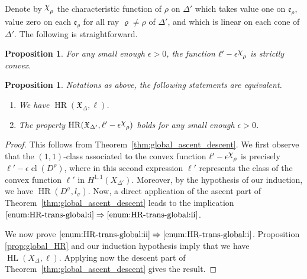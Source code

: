 \documentclass[11pt]{amsart}
\newcommand{\defaultRoman}{{\textnormal{(\textit{\roman*})}}}
\newtheorem{prop}[thm]{Proposition}
\theoremstyle{definition}
\numberwithin{equation}{section}
\renewcommand{\~}{\widetilde}
\let\oldchi\chi
\newcommand{\raisechi}[2]{\raisebox{.4ex}{$#1#2$}}
\renewcommand{\chi}{{\mathpalette\raisechi\oldchi}}
\DeclareMathOperator{\HR}{HR} %
\DeclareMathOperator{\HL}{HL} %
\DeclareMathOperator{\class}{cl} %
\newcommand{\e}{{\mathfrak e}} %
\newcommand{\X}{\mathfrak X}
\begin{document}
Denote by $\chi_\rho$ the characteristic function of $\rho$ on $\Delta'$ which takes value one on $\e_\rho$, value zero on each $\e_\varrho$ for all ray $\varrho \neq \rho$ of $\Delta'$, and which is linear on each cone of $\Delta'$.
The following is straightforward.

\begin{prop} For any small enough $\epsilon>0$, the function $\ell' - \epsilon \chi_\rho$ is strictly convex. \end{prop}

\begin{prop} \label{prop:HR-trans-global}
Notations as above, the following statements are equivalent.
\begin{enumerate}[label=\defaultRoman]
\item \label{enum:HR-trans-global:i} We have $\HR(\X_\Delta, \ell)$.
\item \label{enum:HR-trans-global:ii} The property $\HR(\X_{\Delta'},\ell'-\epsilon \chi_\rho)$ holds for any small enough $\epsilon>0$.
\end{enumerate}
\end{prop}

\begin{proof}
This follows from Theorem~\ref{thm:global_ascent_descent}. We first observe that the $(1,1)$-class associated to the convex function $\ell'-\epsilon \chi_\rho$ is precisely $\ell' - \epsilon \class(D^\rho)$, where in this second expression $\ell'$ represents the class of the convex function $\ell'$ in $H^{1,1}(X_{\Delta'})$. Moreover, by the hypothesis of our induction, we have $\HR(D^\sigma, l_\sigma)$. Now, a direct application of the ascent part of Theorem~\ref{thm:global_ascent_descent} leads to the implication $\ref{enum:HR-trans-global:i} \Rightarrow \ref{enum:HR-trans-global:ii}$.

We now prove $\ref{enum:HR-trans-global:ii} \Rightarrow \ref{enum:HR-trans-global:i}$. Proposition \ref{prop:global_HR} and our induction hypothesis imply that we have $\HL(X_{\Delta}, \ell)$. Applying now the descent part of Theorem~\ref{thm:global_ascent_descent} gives the result.
\end{proof}
\end{document}
